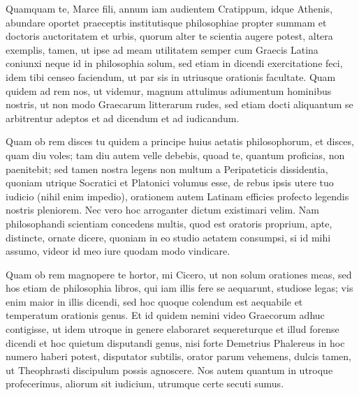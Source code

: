 
 Quamquam te, Marce fili, annum iam audientem Cratippum, idque Athenis, abundare oportet praeceptis institutisque philosophiae propter summam et doctoris auctoritatem et urbis, quorum alter te scientia augere potest, altera exemplis, tamen, ut ipse ad meam utilitatem semper cum Graecis Latina coniunxi neque id in philosophia solum, sed etiam in dicendi exercitatione feci, idem tibi censeo faciendum, ut par sis in utriusque orationis facultate. Quam quidem ad rem nos, ut videmur, magnum attulimus adiumentum hominibus nostris, ut non modo Graecarum litterarum rudes, sed etiam docti aliquantum se arbitrentur adeptos et ad dicendum et ad iudicandum.

 Quam ob rem disces tu quidem a principe huius aetatis philosophorum, et disces, quam diu voles; tam diu autem velle debebis, quoad te, quantum proficias, non paenitebit; sed tamen nostra legens non multum a Peripateticis dissidentia, quoniam utrique Socratici et Platonici volumus esse, de rebus ipsis utere tuo iudicio (nihil enim impedio), orationem autem Latinam efficies profecto legendis nostris pleniorem. Nec vero hoc arroganter dictum existimari velim. Nam philosophandi scientiam concedens multis, quod est oratoris proprium, apte, distincte, ornate dicere, quoniam in eo studio aetatem consumpsi, si id mihi assumo, videor id meo iure quodam modo vindicare.

 Quam ob rem magnopere te hortor, mi Cicero, ut non solum orationes meas, sed hos etiam de philosophia libros, qui iam illis fere se aequarunt, studiose legas; vis enim maior in illis dicendi, sed hoc quoque colendum est aequabile et temperatum orationis genus. Et id quidem nemini video Graecorum adhuc contigisse, ut idem utroque in genere elaboraret sequereturque et illud forense dicendi et hoc quietum disputandi genus, nisi forte Demetrius Phalereus in hoc numero haberi potest, disputator subtilis, orator parum vehemens, dulcis tamen, ut Theophrasti discipulum possis agnoscere. Nos autem quantum in utroque profecerimus, aliorum sit iudicium, utrumque certe secuti sumus.

